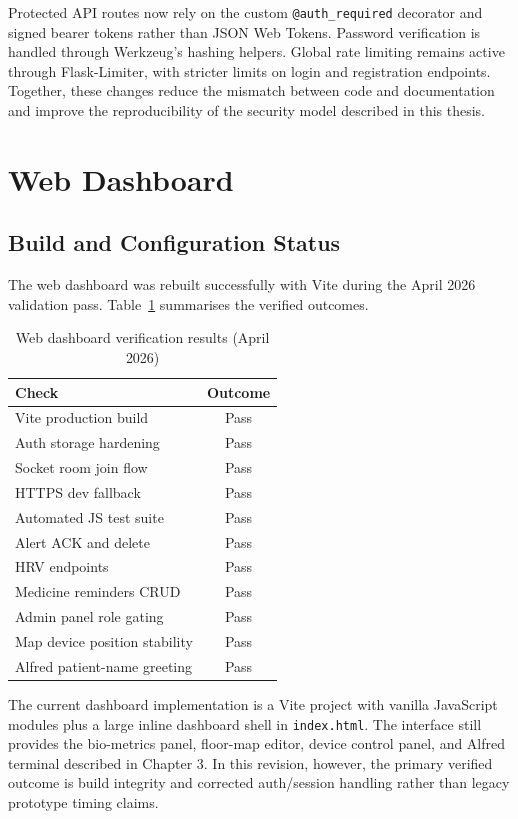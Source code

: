 Protected API routes now rely on the custom \texttt{@auth\_required} decorator and
signed bearer tokens rather than JSON Web Tokens. Password verification is handled
through Werkzeug's hashing helpers. Global rate limiting remains active through
Flask-Limiter, with stricter limits on login and registration endpoints. Together,
these changes reduce the mismatch between code and documentation and improve the
reproducibility of the security model described in this thesis.

\section{Web Dashboard}

\subsection{Build and Configuration Status}

The web dashboard was rebuilt successfully with Vite during the April 2026 validation pass. Table~\ref{tab:web_verify} summarises the verified outcomes.

\begin{table}[ht]
\centering
\caption{Web dashboard verification results (April 2026)}
\label{tab:web_verify}
\begin{tabular}{lc}
\toprule
\textbf{Check} & \textbf{Outcome} \\
\midrule
Vite production build & Pass \\
Auth storage hardening & Pass \\
Socket room join flow & Pass \\
HTTPS dev fallback & Pass \\
Automated JS test suite & Pass \\
Alert ACK and delete & Pass \\
HRV endpoints & Pass \\
Medicine reminders CRUD & Pass \\
Admin panel role gating & Pass \\
Map device position stability & Pass \\
Alfred patient-name greeting & Pass \\
\bottomrule
\end{tabular}
\end{table}

The current dashboard implementation is a Vite project with vanilla JavaScript
modules plus a large inline dashboard shell in \texttt{index.html}. The interface
still provides the bio-metrics panel, floor-map editor, device control panel, and
Alfred terminal described in Chapter 3. In this revision, however, the primary
verified outcome is build integrity and corrected auth/session handling rather than
legacy prototype timing claims.

